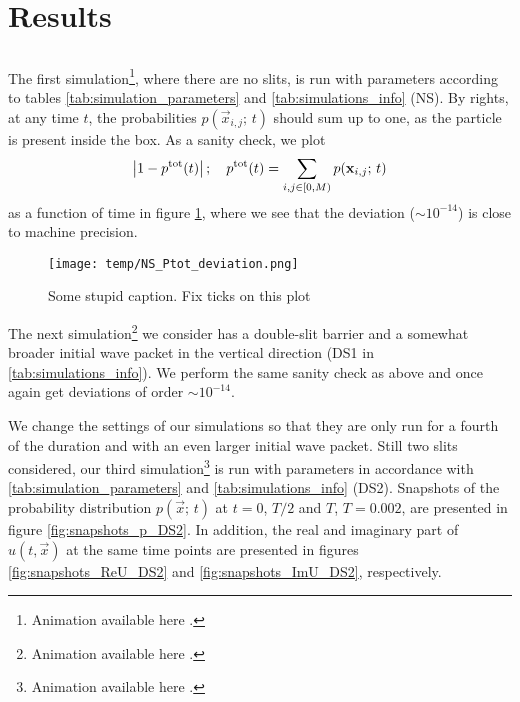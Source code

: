 \section{Results}\label{sec:results}




\subsection{}

    The first simulation\footnote{Animation available here .}, where there are no slits, is run with parameters according to tables \ref{tab:simulation_parameters} and \ref{tab:simulations_info} (NS). By rights, at any time $t$, the probabilities $p(\vec{x}_{i,j}; \, t)$ should sum up to one, as the particle is present inside the box. As a sanity check, we plot 
    \begin{equation}\label{eq:total_probability_deviation}
        \abs{1- p^\mathrm{tot}(t)}\,; \quad p^\mathrm{tot}(t) = \sum_{i,j\in [0, M)} p(\mathbf{x}_{i,j};\, t)
    \end{equation}
    as a function of time in figure \ref{fig:ptot_deviation_NS}, where we see that the deviation ($\sim 10^{-14}$) is close to machine precision.
    \begin{figure}[ht!]
        \centering
        \texttt{[image: temp/NS\_Ptot\_deviation.png]}
        \caption{Some stupid caption. Fix ticks on this plot}
        \label{fig:ptot_deviation_NS}
    \end{figure}

    The next simulation\footnote{Animation available here .} we consider has a double-slit barrier and a somewhat broader initial wave packet in the vertical direction (DS1 in \ref{tab:simulations_info}). We perform the same sanity check as above and once again get deviations of order $\sim 10^{-14}$.

    We change the settings of our simulations so that they are only run for a fourth of the duration and with an even larger initial wave packet. Still two slits considered, our third simulation\footnote{Animation available here .} is run with parameters in accordance with \ref{tab:simulation_parameters} and \ref{tab:simulations_info} (DS2). Snapshots of the probability distribution $p(\vec{x};\, t)$ at $t=0$, $T/2$ and $T$, $T=0.002$, are presented in figure \ref{fig:snapshots_p_DS2}.  In addition, the real and imaginary part of $u(t, \vec{x})$ at the same time points are presented in figures \ref{fig:snapshots_ReU_DS2} and \ref{fig:snapshots_ImU_DS2}, respectively.

